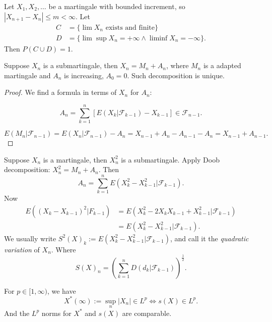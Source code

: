 
\begin{theorem}
	Let $X_1, X_2, \ldots$ be a martingale with bounded increment, so $|X_{n+1}-X_n| \le m < \infty $. Let
	\begin{align}
		C &= \{\lim X_n \text{ exists and finite}\} \\
		D &= \{\lim\sup  X_n = + \infty \wedge \liminf X_n = - \infty \} 
	.\end{align} 
	Then $P(C \cup D) = 1$.
\end{theorem}

\begin{theorem}
	Suppose $X_n$ is a submartingale, then $X_n = M_n + A_n$, where $M_n$ is a adapted martingale and $A_n$ is increasing, $A_0 = 0$. Such decomposition is unique.
\end{theorem}
\begin{proof}
We find a formula in terms of $X_n$ for $A_n$:

\[
	A_n = \sum_{k = 1}^n \left[ E(X_k | \mathcal{F}_{k-1}) - X_{k-1} \right] \in \mathcal{F}_{n-1}
.\] 

\[
	E(M_n | \mathcal{F}_{n-1}) = E(X_n | \mathcal{F}_{n-1 }) - A_n = X_{n-1} + A_n - A_{n-1} - A_n = X_{n-1} + A_{n-1}
.\] 
\end{proof}

\begin{example}
	Suppose $X_n$ is a martingale, then $X_n^2$ is a submartingale. Apply Doob decomposition: $X_n^2 = M_n + A_n$. Then
	 \[
		A_n = \sum_{k = 1}^n E\left( X_k^2 - X_{k-1}^2 | \mathcal{F}_{k-1} \right) 
	.\] 
	Now
	\begin{align*}
		E\left( \left( X_k - X_{k-1 } \right) ^2 | F_{k-1} \right) 
		&= E\left( X_k^2 - 2 X_k X_{k-1 } + X_{k-1 }^2 | \mathcal{F}_{k-1} \right)  \\
		&= E\left( X_k^2 - X_{k-1 }^2 | \mathcal{F}_{k-1}\right)
	.\end{align*}
	We usually write $S^2(X)_k := E\left( X_k^2 - X_{k-1}^2 | \mathcal{F}_{k-1} \right) $, and call it the \textit{quadratic variation} of $X_n$.
	Where
	\[
		S(X)_n = \left( \sum_{k =1}^n D(d_k | \mathcal{F}_{k-1}) \right) ^{\frac{1}{2}}
	.\] 
\end{example}
\begin{theorem}
	For $p \in [1, \infty )$, we have
	\[
		X^*(\infty ) := \sup_{n} |X_n| \in L^p
		\iff  s(X) \in L^p
	.\] 
	And the $L^p$ norms for $X^*$ and $s(X)$ are comparable.
\end{theorem}

